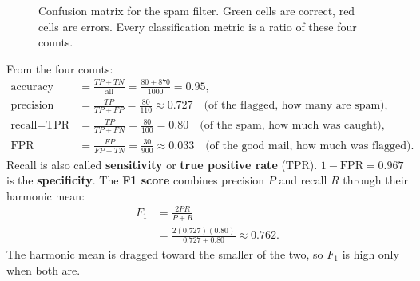 \begin{figure}[H]
\centering
{}
\caption{Confusion matrix for the spam filter. Green cells are correct, red cells are errors.
Every classification metric is a ratio of these four counts.}
\label{fig:ml-confusion}
\end{figure}

From the four counts:
\begin{align*}
\text{accuracy} &= \frac{TP+TN}{\text{all}} = \frac{80+870}{1000} = 0.95,\\
\text{precision} &= \frac{TP}{TP+FP} = \frac{80}{110} \approx 0.727 \quad\text{(of the flagged, how many are spam)},\\
\text{recall} = \text{TPR} &= \frac{TP}{TP+FN} = \frac{80}{100} = 0.80 \quad\text{(of the spam, how much was caught)},\\
\text{FPR} &= \frac{FP}{FP+TN} = \frac{30}{900} \approx 0.033 \quad\text{(of the good mail, how much was flagged)}.
\end{align*}
Recall is also called \textbf{sensitivity} or \textbf{true positive rate} (TPR).
$1-\text{FPR}=0.967$ is the \textbf{specificity}. The \textbf{F1 score} combines precision $P$
and recall $R$ through their harmonic mean:
\begin{align*}
F_1 &= \frac{2PR}{P+R} \\
&= \frac{2(0.727)(0.80)}{0.727+0.80} \approx 0.762 .
\end{align*}
The harmonic mean is dragged toward the smaller of the two, so $F_1$ is high only when both
are.

